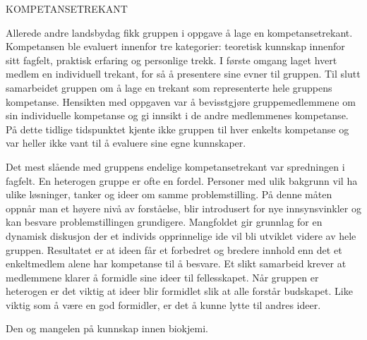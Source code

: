 KOMPETANSETREKANT

Allerede andre landsbydag fikk gruppen i oppgave å lage en kompetansetrekant. Kompetansen ble evaluert innenfor tre kategorier: teoretisk kunnskap innenfor sitt fagfelt, praktisk erfaring og personlige trekk. 
I første omgang laget hvert medlem en individuell trekant, for så å presentere sine evner til gruppen. 
Til slutt samarbeidet gruppen om å lage en trekant som representerte hele gruppens kompetanse.
Hensikten med oppgaven var å bevisstgjøre gruppemedlemmene om sin individuelle kompetanse og gi innsikt i de andre medlemmenes kompetanse. 
På dette tidlige tidspunktet kjente ikke gruppen til hver enkelts kompetanse og var heller ikke vant til å evaluere sine egne kunnskaper.

Det mest slående med gruppens endelige kompetansetrekant var spredningen i fagfelt.
En heterogen gruppe er ofte en fordel.
Personer med ulik bakgrunn vil ha ulike løsninger, tanker og ideer om samme problemstilling. 
På denne måten oppnår man et høyere nivå av forståelse, blir introdusert for nye innsynsvinkler og kan besvare problemstillingen grundigere.
Mangfoldet gir grunnlag for en dynamisk diskusjon der et individs opprinnelige ide vil bli utviklet videre av hele gruppen.
Resultatet er at ideen får et forbedret og bredere innhold enn det et enkeltmedlem alene har kompetanse til å besvare.
Et slikt samarbeid krever at medlemmene klarer å formidle sine ideer til fellesskapet.
Når gruppen er heterogen er det viktig at ideer blir formidlet slik at alle forstår budskapet.
Like viktig som å være en god formidler, er det å kunne lytte til andres ideer. 


Den og mangelen på kunnskap innen biokjemi.
